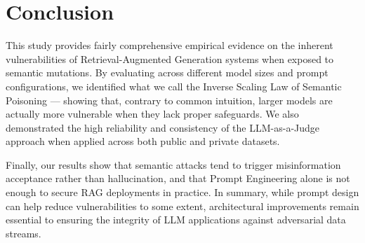 \section{Conclusion}
This study provides fairly comprehensive empirical evidence on the inherent vulnerabilities of Retrieval-Augmented Generation systems when exposed to semantic mutations. By evaluating across different model sizes and prompt configurations, we identified what we call the Inverse Scaling Law of Semantic Poisoning --- showing that, contrary to common intuition, larger models are actually more vulnerable when they lack proper safeguards. We also demonstrated the high reliability and consistency of the LLM-as-a-Judge approach when applied across both public and private datasets.

Finally, our results show that semantic attacks tend to trigger misinformation acceptance rather than hallucination, and that Prompt Engineering alone is not enough to secure RAG deployments in practice. In summary, while prompt design can help reduce vulnerabilities to some extent, architectural improvements remain essential to ensuring the integrity of LLM applications against adversarial data streams.
